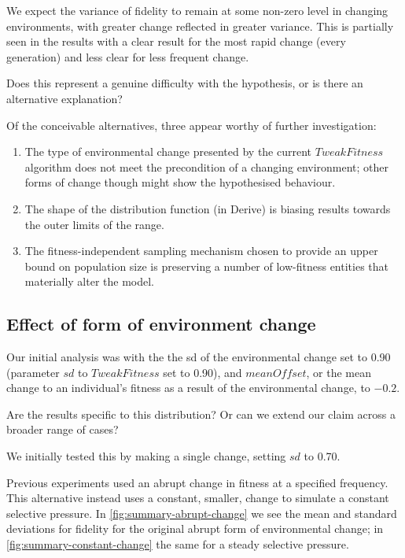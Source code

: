 We expect the variance of fidelity to remain at some non-zero level in changing environments, with greater change reflected in greater variance. This is partially seen in the results with a clear result for the most rapid change (every generation) and less clear for less frequent change.

Does this represent a genuine difficulty with the hypothesis, or is there an alternative explanation?

Of the conceivable alternatives, three appear worthy of further investigation:

\begin{enumerate}
	\item The type of environmental change presented by the current $TweakFitness$ algorithm does not meet the precondition of a changing environment; other forms of change though might show the hypothesised behaviour.
	\item The shape of the distribution function (in Derive) is biasing results towards the outer limits of the range.
	\item The fitness-independent sampling mechanism chosen to provide an upper bound on population size is preserving a number of low-fitness entities that materially alter the model.
\end{enumerate}

\subsection{Effect of form of environment change}

Our initial analysis was with the the \gls{sd} of the environmental change set to 0.90 (parameter $sd$ to $TweakFitness$ set to 0.90), and $meanOffset$, or the mean change to an individual's fitness as a result of the environmental change, to $-0.2$.

Are the results specific to this distribution? Or can we extend our claim across a broader range of cases?

We initially tested this by making a single change, setting $sd$ to 0.70.

Previous experiments used an abrupt change in fitness at a specified frequency. This alternative instead uses a constant, smaller, change to simulate a constant selective pressure.  In \ref{fig:summary-abrupt-change} we see the mean and standard deviations for fidelity for the original abrupt form of environmental change; in \ref{fig:summary-constant-change} the same for a steady selective pressure.



